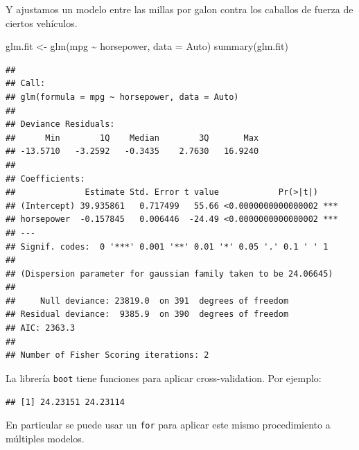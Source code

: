 \documentclass[
  12pt,
]{book}
\newenvironment{Shaded}{\begin{snugshade}}{\end{snugshade}}
\newcommand{\AttributeTok}[1]{\textcolor[rgb]{0.77,0.63,0.00}{#1}}
\newcommand{\ControlFlowTok}[1]{\textcolor[rgb]{0.13,0.29,0.53}{\textbf{#1}}}
\newcommand{\DecValTok}[1]{\textcolor[rgb]{0.00,0.00,0.81}{#1}}
\newcommand{\FunctionTok}[1]{\textcolor[rgb]{0.00,0.00,0.00}{#1}}
\newcommand{\NormalTok}[1]{#1}
\newcommand{\OtherTok}[1]{\textcolor[rgb]{0.56,0.35,0.01}{#1}}
\newcommand{\SpecialCharTok}[1]{\textcolor[rgb]{0.00,0.00,0.00}{#1}}
\theoremstyle{definition}
\theoremstyle{definition}
\theoremstyle{definition}
\theoremstyle{definition}
\theoremstyle{remark}
\begin{document}
Y ajustamos un modelo entre las millas por galon contra los caballos de fuerza de ciertos vehículos.

\begin{Shaded}
\begin{Highlighting}[]
\NormalTok{glm.fit }\OtherTok{\textless{}{-}} \FunctionTok{glm}\NormalTok{(mpg }\SpecialCharTok{\textasciitilde{}}\NormalTok{ horsepower, }\AttributeTok{data =}\NormalTok{ Auto)}
\FunctionTok{summary}\NormalTok{(glm.fit)}
\end{Highlighting}
\end{Shaded}

\begin{verbatim}
## 
## Call:
## glm(formula = mpg ~ horsepower, data = Auto)
## 
## Deviance Residuals: 
##      Min        1Q    Median        3Q       Max  
## -13.5710   -3.2592   -0.3435    2.7630   16.9240  
## 
## Coefficients:
##              Estimate Std. Error t value            Pr(>|t|)    
## (Intercept) 39.935861   0.717499   55.66 <0.0000000000000002 ***
## horsepower  -0.157845   0.006446  -24.49 <0.0000000000000002 ***
## ---
## Signif. codes:  0 '***' 0.001 '**' 0.01 '*' 0.05 '.' 0.1 ' ' 1
## 
## (Dispersion parameter for gaussian family taken to be 24.06645)
## 
##     Null deviance: 23819.0  on 391  degrees of freedom
## Residual deviance:  9385.9  on 390  degrees of freedom
## AIC: 2363.3
## 
## Number of Fisher Scoring iterations: 2
\end{verbatim}

La librería \texttt{boot} tiene funciones para aplicar cross-validation. Por ejemplo:

\begin{Shaded}
\end{Shaded}

\begin{verbatim}
## [1] 24.23151 24.23114
\end{verbatim}

En particular se puede usar un \texttt{for} para aplicar este mismo procedimiento a múltiples modelos.

\begin{Shaded}
\end{Shaded}
\end{document}
